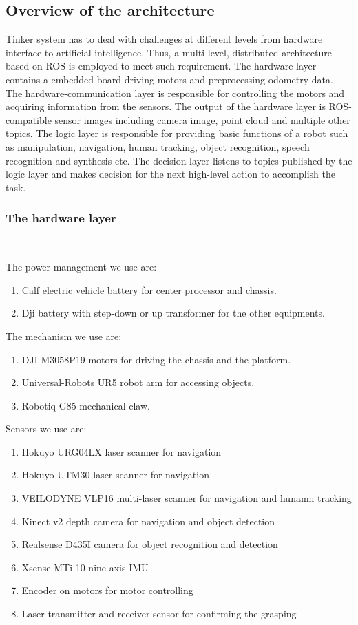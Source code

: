 \subsection{Overview of the architecture}
Tinker system has to deal with challenges at different levels from hardware interface to artificial intelligence. Thus, a multi-level, distributed architecture based on ROS is employed to meet such requirement. The hardware layer contains a embedded board driving motors and preprocessing odometry data. The hardware-communication layer is responsible for controlling the motors and acquiring information from the sensors. The output of the hardware layer is ROS-compatible sensor images including camera image, point cloud and multiple other topics. The logic layer is responsible for providing basic functions of a robot such as manipulation, navigation, human tracking, object recognition, speech recognition and synthesis etc. The decision layer listens to topics published by the logic layer and makes decision for the next high-level action to accomplish the task.

\subsubsection{The hardware layer}
\ 

The power management we use are:
\begin{enumerate}
	\item Calf electric vehicle battery for center processor and chassis.
	\item Dji battery with step-down or up transformer for the other equipments.
\end{enumerate}

The mechanism we use are:
\begin{enumerate}
    \item DJI M3058P19 motors for driving the chassis and the platform.
    \item Universal-Robots UR5 robot arm for accessing objects.
    \item Robotiq-G85 mechanical claw.
\end{enumerate}

Sensors we use are:
\begin{enumerate}
    \item Hokuyo URG04LX laser scanner for navigation
    \item Hokuyo UTM30 laser scanner for navigation
    \item VEILODYNE VLP16 multi-laser scanner for navigation and hunamn tracking
    \item Kinect v2 depth camera for navigation and object detection
    \item Realsense D435I camera for object recognition and detection
    \item Xsense MTi-10 nine-axis IMU
    \item Encoder on motors for motor controlling
    \item Laser transmitter and receiver sensor for confirming the grasping
\end{enumerate}

